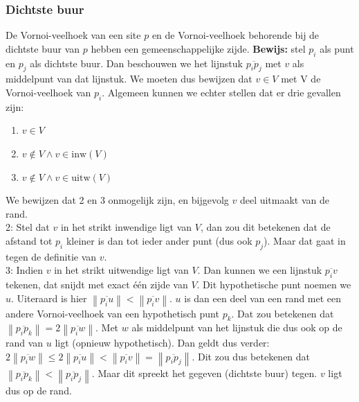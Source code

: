 \documentclass[a4paper,titlepage]{article}
\newcommand{\inw}[1]{\mbox{inw}\left(#1\right)}
\newcommand{\uitw}[1]{\mbox{uitw}\left(#1\right)}
\newcommand{\norm}[1]{\left\|#1\right\|}
\newcommand{\linep}[1]{\overline{#1}}
\begin{document}
\subsubsection{Dichtste buur}
De Vornoi-veelhoek van een site $p$ en de Vornoi-veelhoek behorende bij de dichtste buur van $p$ hebben een gemeenschappelijke zijde.
\textbf{Bewijs: }stel $p_i$ als punt en $p_j$ als dichtste buur. Dan beschouwen we het lijnstuk $\linep{p_ip_j}$ met $v$ als middelpunt van dat lijnstuk. We moeten dus bewijzen dat $v\in V$ met V de Vornoi-veelhoek van $p_i$. Algemeen kunnen we echter stellen dat er drie gevallen zijn:
\begin{enumerate}
 \item $v\in V$
 \item $v\notin V\wedge v\in\inw{V}$
 \item $v\notin V\wedge v\in\uitw{V}$
\end{enumerate}
We bewijzen dat 2 en 3 onmogelijk zijn, en bijgevolg $v$ deel uitmaakt van de rand.\\
2: Stel dat $v$ in het strikt inwendige ligt van $V$, dan zou dit betekenen dat de afstand tot $p_i$ kleiner is dan tot ieder ander punt (dus ook $p_j$). Maar dat gaat in tegen de definitie van $v$.\\
3: Indien $v$ in het strikt uitwendige ligt van $V$. Dan kunnen we een lijnstuk $\linep{p_iv}$ tekenen, dat snijdt met exact \'e\'en zijde van $V$. Dit hypothetische punt noemen we $u$. Uiteraard is hier $\norm{\linep{p_iu}}<\norm{\linep{p_iv}}$. $u$ is dan een deel van een rand met een andere Vornoi-veelhoek van een hypothetisch punt $p_k$. Dat zou betekenen dat $\norm{\linep{p_ip_k}}=2\norm{\linep{p_iw}}$. Met $w$ als middelpunt van het lijnstuk die dus ook op de rand van $u$ ligt (opnieuw hypothetisch). Dan geldt dus verder:$2\norm{\linep{p_iw}}\leq2\norm{\linep{p_iu}}<\norm{\linep{p_iv}}=\norm{\linep{p_ip_j}}$. Dit zou dus betekenen dat $\norm{\linep{p_ip_k}}<\norm{\linep{p_ip_j}}$. Maar dit spreekt het gegeven (dichtste buur) tegen. $v$ ligt dus op de rand.
\end{document}
